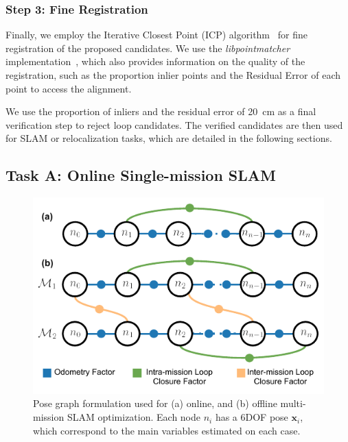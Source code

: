 \subsubsection{\textbf{Step 3: Fine Registration}}
\label{subsubsec:fine-registration}
Finally, we employ the Iterative Closest Point (ICP) algorithm~\cite{besl1992icp} for fine registration of the proposed candidates. We use the \emph{libpointmatcher} implementation~\cite{pomerleau2013iros}, which also provides information on the quality of the registration, such as the proportion inlier points and the Residual Error of each point to access the alignment.

We use the proportion of inliers and the residual error of \SI{20}{\centi\meter} as a final verification step to reject loop candidates. The verified candidates are then used for SLAM or relocalization tasks, which are detailed in the following sections.

\subsection*{Task A: Online Single-mission SLAM} 
\label{sec:online_slam_mode}
\begin{figure}[t]
  \centering
  \includegraphics[width=0.99\columnwidth]{pics/factor_graph_v2}
  \caption{Pose graph formulation used for (a) online, and (b) offline multi-mission SLAM optimization. Each node $n_{i}$ has a 6DOF pose $\mathbf{x}_{i}$, which correspond to the main variables estimated on each case.}
  \label{fig:factor_graph}
\end{figure}


